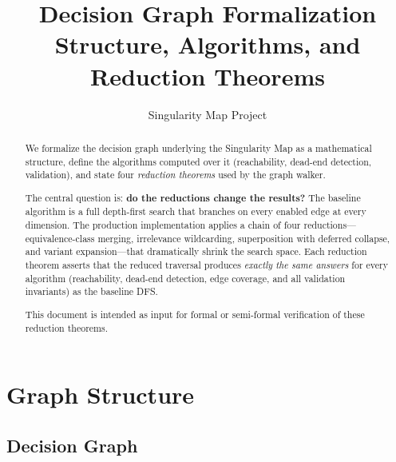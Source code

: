 \documentclass[11pt]{article}
\title{Decision Graph Formalization\\[4pt]
       \large Structure, Algorithms, and Reduction Theorems}
\author{Singularity Map Project}
\date{}
\theoremstyle{definition}
\begin{document}
\maketitle

\begin{abstract}
We formalize the decision graph underlying the Singularity Map as a
mathematical structure, define the algorithms computed over it
(reachability, dead-end detection, validation), and state four
\emph{reduction theorems} used by the graph walker.

The central question is: \textbf{do the reductions change the results?}
The baseline algorithm is a full depth-first search that branches on every
enabled edge at every dimension. The production implementation applies a
chain of four reductions---equivalence-class merging, irrelevance
wildcarding, superposition with deferred collapse, and variant
expansion---that dramatically shrink the search space. Each reduction
theorem asserts that the reduced traversal produces \emph{exactly the same
answers} for every algorithm (reachability, dead-end detection, edge
coverage, and all validation invariants) as the baseline DFS.

This document is intended as input for formal or semi-formal verification
of these reduction theorems.
\end{abstract}

\tableofcontents
\newpage

\section{Graph Structure}\label{sec:structure}

\subsection{Decision Graph}
\end{document}
